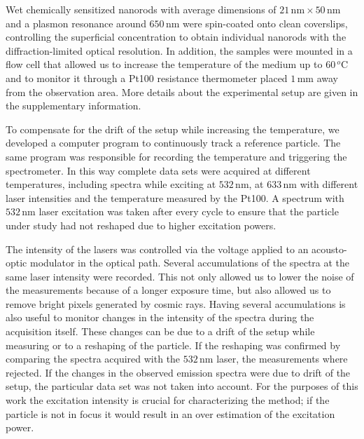 \documentclass[journal=nalefd,manuscript=letter]{achemso}
\newcommand{\nm}{\ensuremath{\,\textrm{nm}}}
\newcommand{\mm}{\ensuremath{\,\textrm{mm}}}
\newcommand{\degree}{\ensuremath{\,^o\textrm{C}}}
\begin{document}
Wet chemically sensitized nanorods\cite{Nikoobakht2003} with average dimensions
of $21\nm\times50\nm$ and a plasmon resonance around $650\nm$ were spin-coated
onto clean coverslips, controlling the superficial concentration to obtain
individual nanorods with the diffraction-limited optical resolution.
In addition, the samples were mounted in a flow cell that allowed us to increase
the temperature of the medium up to $60\degree$ and to monitor it through a
Pt100 resistance thermometer placed $1\mm$ away from the observation area. More
details about the experimental setup are given in the supplementary information.

To compensate for the drift of the setup while increasing the temperature, we
developed a computer program to continuously track a reference particle. The
same program was responsible for recording the temperature and triggering the
spectrometer. In this way complete data sets were acquired at different
temperatures, including spectra while exciting at $532\nm$, at $633\nm$ with
different laser intensities and the temperature measured by the Pt100. A
spectrum with $532\nm$ laser excitation was taken after every cycle to ensure
that the particle under study had not reshaped due to higher excitation powers.

The intensity of the lasers was controlled via the voltage applied to an
acousto-optic modulator in the optical path. Several accumulations of the
spectra at the same laser intensity were recorded. This not only allowed us to
lower the noise of the measurements because of a longer exposure time, but also
allowed us to remove bright pixels generated by cosmic rays. Having several
accumulations is also useful to monitor changes in the intensity of the spectra
during the acquisition itself. These changes can be due to a drift of the setup
while measuring or to a reshaping of the particle. If the reshaping was
confirmed by comparing the spectra acquired with the $532\nm$
laser\cite{Liu2009}, the measurements where rejected. If the changes in the
observed emission spectra were due to drift of the setup, the particular data
set was not taken into account. For the purposes of this work the excitation
intensity is crucial for characterizing the method; if the particle is not in
focus it would result in an over estimation of the excitation power.

\end{document}
